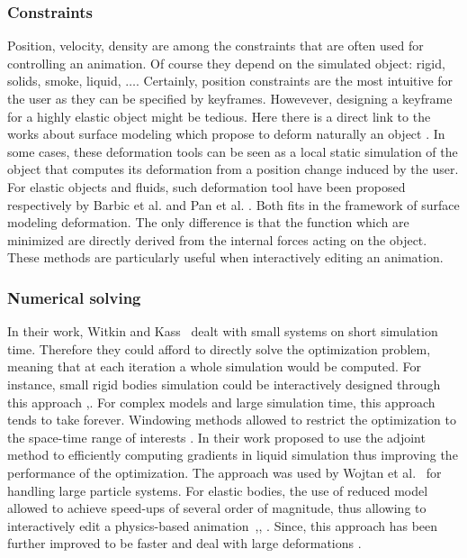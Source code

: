 \subsubsection{Constraints}
Position, velocity, density are among the constraints that are often used for controlling an animation. Of course they depend on the simulated object: rigid, solids, smoke, liquid, $\dots$. Certainly, position constraints are the most intuitive for the user as they can be specified by keyframes. Howevever, designing a keyframe for a highly elastic object might be tedious. Here there is a direct link to the works about surface modeling which propose to deform naturally an object \cite{Sorkine2007, Hildebrandt2011}. In some cases, these deformation tools can be seen as a local static simulation of the object that computes its deformation from a position change induced by the user. For elastic objects and fluids, such deformation tool have been proposed respectively by Barbic et al. \cite{Barbic2012} and Pan et al. \cite{Pan2013}. Both fits in the framework of surface modeling deformation. The only difference is that the function which are minimized are directly derived from the internal forces acting on the object. These methods are particularly useful when interactively editing an animation.

\subsubsection{Numerical solving}
In their work, Witkin and Kass~\cite{Witkin1988} dealt with small systems on short simulation time. Therefore they could afford to directly solve the optimization problem, meaning that at each iteration a whole simulation would be computed. For instance, small rigid bodies simulation could be interactively designed through this approach \cite{Popovic2000},\cite{Popovic2003}. For complex models and large simulation time, this approach tends to take forever. Windowing methods allowed to restrict the optimization to the space-time range of interests \cite{Cohen1992}. In their work \cite{McNamara2004} proposed to use the adjoint method to efficiently computing gradients in liquid simulation thus improving the performance of the optimization. The approach was used by Wojtan et al.~\cite{wojtan2006keyframe} for handling large particle systems. For elastic bodies, the use of reduced model allowed to achieve speed-ups of several order of magnitude, thus allowing to interactively edit a physics-based animation~\cite{Barbic2012},\cite{Hildebrandt2012}, \cite{Hahn2012}. Since, this approach has been further improved to be faster \cite{Schulz2014} and deal with large deformations \cite{Li2014}.

